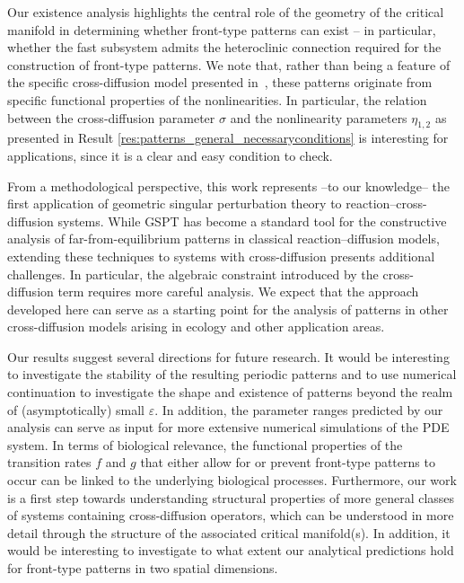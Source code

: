 \documentclass[a4paper,10pt,abstract=true,parskip=true]{scrartcl}
\theoremstyle{remark}
\numberwithin{equation}{section}
\numberwithin{thm}{section}
\begin{document}
Our existence analysis highlights the central role of the geometry of the critical manifold in determining whether front-type patterns can exist -- in particular, whether the fast subsystem admits the heteroclinic connection required for the construction of front-type patterns. We note that, rather than being a feature of the specific cross-diffusion model presented in~\cite{GIS_2026}, these patterns originate from specific functional properties of the nonlinearities. In particular, the relation between the cross-diffusion parameter $\sigma$ and the nonlinearity parameters $\eta_{1,2}$ as presented in Result \ref{res:patterns_general_necessaryconditions} is interesting for applications, since it is a clear and easy condition to check.

From a methodological perspective, this work represents --to our knowledge-- the first application of geometric singular perturbation theory to reaction--cross-diffusion systems. While GSPT has become a standard tool for the constructive analysis of far-from-equilibrium patterns in classical reaction--diffusion models, extending these techniques to systems with cross-diffusion presents additional challenges. In particular, the algebraic constraint introduced by the cross-diffusion term requires more careful analysis. We expect that the approach developed here can serve as a starting point for the analysis of patterns in other cross-diffusion models arising in ecology and other application areas.

Our results suggest several directions for future research. It would be interesting to investigate the stability of the resulting periodic patterns and to use numerical continuation to investigate the shape and existence of patterns beyond the realm of (asymptotically) small $\varepsilon$. In addition, the parameter ranges predicted by our analysis can serve as input for more extensive numerical simulations of the PDE system. In terms of biological relevance, the functional properties of the transition rates $f$ and $g$ that either allow for or prevent front-type patterns to occur can be linked to the underlying biological processes. Furthermore, our work is a first step towards understanding structural properties of more general classes of systems containing cross-diffusion operators, which can be understood in more detail through the structure of the associated critical manifold(s). In addition, it would be interesting to investigate to what extent our analytical predictions hold for front-type patterns in two spatial dimensions. 
\end{document}
